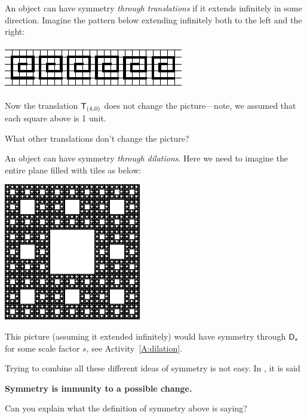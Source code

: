 \documentclass{ximera}
\begin{document}
An object can have symmetry \textit{through translations} if it
extends infinitely in some direction.  Imagine the pattern
below extending infinitely both to the left and the right:
\begin{image}
\includegraphics{fpGraphEx1.pdf}
\end{image}
Now the translation $\mathsf{T}_{(4,0)}$ does not change the
picture---note, we assumed that each square above is 1 unit.

\begin{question}
What other translations don't change the picture?
\end{question}



An object can have symmetry \textit{through dilations}.  Here we need
to imagine the entire plane filled with tiles as below:
\begin{image}
\includegraphics{sierpinskiCarpet.pdf}
\end{image}
This picture (assuming it extended infinitely) would have symmetry
through $\mathsf{D}_s$ for some scale factor $s$, see Activity~\ref{A:dilation}.


Trying to combine all these different ideas of symmetry is not easy.
In \cite{rosen}, it is said
\begin{center}
\textbf{Symmetry is immunity to a possible change.}
\end{center}

\begin{question}
Can you explain what the definition of symmetry above is saying?
\end{question}
\end{document}
